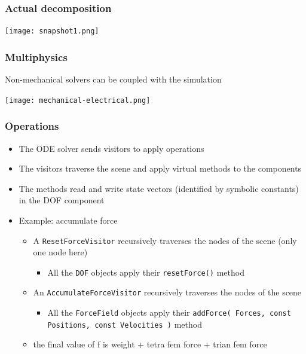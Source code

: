 \documentclass[a4paper,compress]{beamer}
\begin{document}
\begin{frame}
\frametitle{Actual decomposition}
\texttt{[image: snapshot1.png]}

\end{frame}

\begin{frame}
\frametitle{Multiphysics}
Non-mechanical solvers can be coupled with the simulation


\texttt{[image: mechanical-electrical.png]}

\end{frame}

\begin{frame}
\frametitle{Operations}

\begin{itemize}
 \item The ODE solver sends visitors to apply operations
 \item The visitors traverse the scene and apply virtual methods to the components
 \item The methods read and write state vectors (identified by symbolic constants) in the DOF component
 \item Example: accumulate force
  \begin{itemize}
   \item A \texttt{ResetForceVisitor} recursively traverses the nodes of the scene (only one node here)
  \begin{itemize}
   \item All the \texttt{DOF} objects apply their \texttt{resetForce()} method
  \end{itemize}
   \item An \texttt{AccumulateForceVisitor} recursively traverses the nodes of the scene 
  \begin{itemize}
   \item All the \texttt{ForceField} objects apply their \texttt{addForce(  Forces, const Positions, const Velocities )} method
  \end{itemize}
   \item the final value of f is weight + tetra fem force + trian fem force
  \end{itemize}
\end{itemize}

\end{frame}
\end{document}
